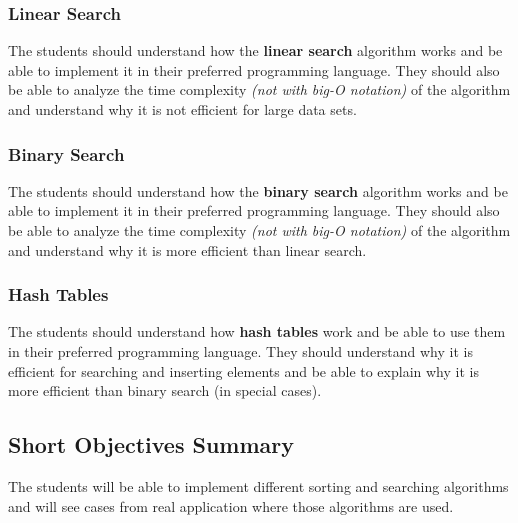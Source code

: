 \documentclass[10pt, oneside]{article}
\theoremstyle{remark}
\begin{document}
\subsubsection{Linear Search}
The students should understand how the \textbf{linear search} algorithm works and be able to implement it in their preferred programming language. They should also be able to analyze the time complexity \textit{(not with big-O notation)} of the algorithm and understand why it is not efficient for large data sets.

\subsubsection{Binary Search}
The students should understand how the \textbf{binary search} algorithm works and be able to implement it in their preferred programming language. They should also be able to analyze the time complexity \textit{(not with big-O notation)} of the algorithm and understand why it is more efficient than linear search.

\subsubsection{Hash Tables}
The students should understand how \textbf{hash tables} work and be able to use them in their preferred programming language. They should understand why it is efficient for searching and inserting elements and be able to explain why it is more efficient than binary search (in special cases).

\subsection{Short Objectives Summary}
The students will be able to implement different sorting and searching algorithms and will see cases from real application where those algorithms are used.
\end{document}
